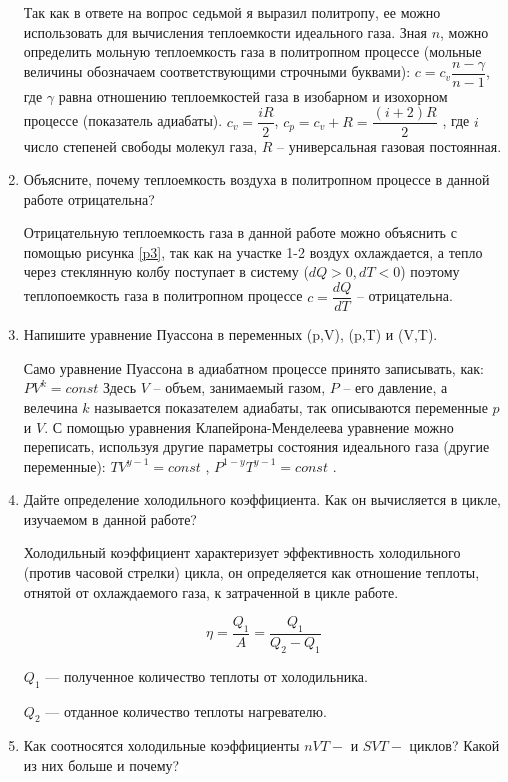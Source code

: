 \documentclass[12pt,a4paper]{article}%
\begin{document}
\begin{enumerate}
	Так как в ответе на вопрос седьмой я выразил политропу, ее можно использовать для вычисления теплоемкости идеального газа. Зная $n$, можно определить мольную теплоемкость газа в политропном процессе (мольные величины обозначаем соответствующими строчными буквами): $c = c_v\dfrac{n - \gamma}{n-1}$, где $\gamma$ равна отношению теплоемкостей газа в изобарном и изохорном процессе (показатель адиабаты). $ c_v = \dfrac{iR}{2} $, $ c_p = c_v+R = \dfrac{(i+2)R}{2} $ , где $i$ число степеней свободы молекул газа, $R$ – универсальная газовая постоянная. 
	
	
	\item Объясните, почему теплоемкость воздуха в политропном процессе в данной работе отрицательна?
	
	Отрицательную теплоемкость газа в данной работе можно объяснить с помощью рисунка \ref{p3}, так как на участке 1-2 воздух охлаждается, а тепло через стеклянную колбу поступает в систему ($ dQ>0, dT<0 $) поэтому теплопоемкость газа в политропном процессе $ c = \dfrac{dQ}{dT} $ – отрицательна.
	
	\item Напишите уравнение Пуассона в переменных (p,V), (p,T) и (V,T).
	
	Само уравнение Пуассона в адиабатном процессе принято записывать, как: 
	$ PV^k = const $
	Здесь $V$ – объем, занимаемый газом, $P$ – его давление, а велечина $k$ называется показателем адиабаты, так описываются переменные $p$ и $V$. С помощью уравнения Клапейрона-Менделеева уравнение можно переписать, используя другие параметры состояния идеального газа (другие переменные): 
	$ TV^{y-1} = const $
	, 
	$ P^{1-y}T^{y-1} = const $ .
	
	\item Дайте определение холодильного коэффициента. Как он вычисляется в цикле, изучаемом в данной работе?
	
	Холодильный коэффициент характеризует эффективность холодильного (против часовой стрелки) цикла, он определяется как отношение теплоты, отнятой от охлаждаемого газа, к затраченной в цикле работе. 
	
	\begin{equation}
	\eta = \dfrac{Q_1}{A} = \dfrac{Q_1}{Q_2 - Q_1}
	\end{equation}
	
	$Q_1$ --- полученное количество теплоты от холодильника.
	
	$Q_2$ --- отданное количество теплоты нагревателю.
	
	\item Как соотносятся холодильные коэффициенты $nVT-$ и $SVT-$ циклов? Какой из них больше и почему?
	

\end{enumerate}
\end{document}
